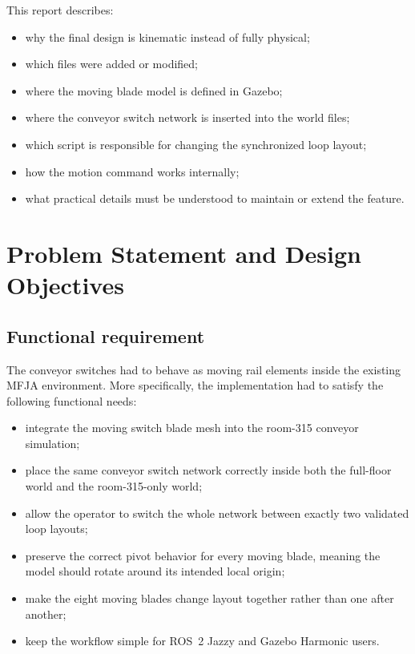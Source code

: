 \documentclass[11pt,a4paper]{article}
\begin{document}
This report describes:
\begin{itemize}
\item why the final design is kinematic instead of fully physical;
\item which files were added or modified;
\item where the moving blade model is defined in Gazebo;
\item where the conveyor switch network is inserted into the world files;
\item which script is responsible for changing the synchronized loop layout;
\item how the motion command works internally;
\item what practical details must be understood to maintain or extend the feature.
\end{itemize}

\section{Problem Statement and Design Objectives}
\subsection{Functional requirement}
The conveyor switches had to behave as moving rail elements inside the existing MFJA environment. More specifically, the implementation had to satisfy the following functional needs:
\begin{itemize}
\item integrate the moving switch blade mesh into the room-315 conveyor simulation;
\item place the same conveyor switch network correctly inside both the full-floor world and the room-315-only world;
\item allow the operator to switch the whole network between exactly two validated loop layouts;
\item preserve the correct pivot behavior for every moving blade, meaning the model should rotate around its intended local origin;
\item make the eight moving blades change layout together rather than one after another;
\item keep the workflow simple for ROS~2 Jazzy and Gazebo Harmonic users.
\end{itemize}
\end{document}
